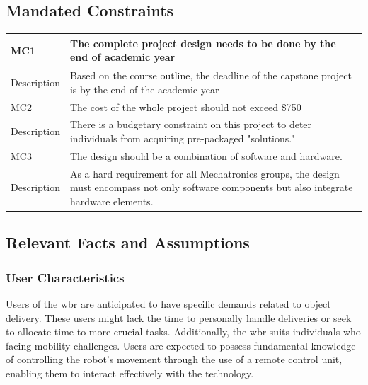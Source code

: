 \documentclass[12pt]{article}
\begin{document}
\subsection{Mandated Constraints}
\begin{center}
    \begin{tabular}{|| p{3cm} || p{8cm} ||}
        \hline
        MC1         & The complete project design needs to be done by the end of academic year                                                                        \\
        \hline
        Description & Based on the course outline, the deadline of the capstone project is by the end of the academic year                                            \\
        \hline\hline
        MC2         & The cost of the whole project should not exceed \$750                                                                                           \\
        \hline
        Description & There is a budgetary constraint on this project to deter individuals from acquiring pre-packaged "solutions."                                   \\
        \hline\hline
        MC3         & The design should be a combination of software and hardware.                                                                                    \\
        \hline
        Description & As a hard requirement for all Mechatronics groups, the design must encompass not only software components but also integrate hardware elements. \\
        \hline\hline
    \end{tabular}
\end{center}

\subsection{Relevant Facts and Assumptions}
\subsubsection{User Characteristics}
Users of the \acrshort{wbr} are anticipated to have specific demands related to object delivery. These users might lack the time to personally handle deliveries or seek to allocate time to more crucial tasks. Additionally, the \acrshort{wbr} suits individuals who facing mobility challenges. Users are expected to possess fundamental knowledge of controlling the robot's movement through the use of a remote control unit, enabling them to interact effectively with the technology.
\end{document}
